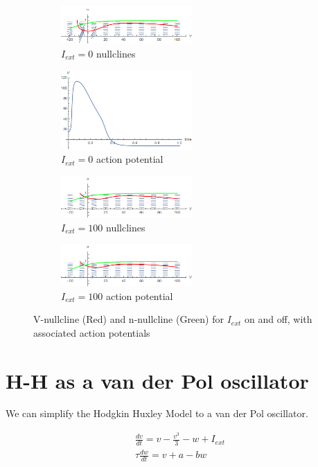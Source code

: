 \documentclass{article}
\begin{document}
\begin{figure}
\centering
\begin{subfigure}{.5\textwidth}
	\centering
	\includegraphics[width=5cm]{fast_slow_nullclines.png}
	\caption{$I_{ext}=0$ nullclines}
\end{subfigure}%
\begin{subfigure}{.5\textwidth}
	\centering
	\includegraphics[width=5cm]{zero_ext_actionpotential.png}
	\caption{$I_{ext}=0$ action potential}
\end{subfigure}
\begin{subfigure}{.5\textwidth}
	\centering
	\includegraphics[width=5cm]{fast_slow_nullclines_iext.png}
	\caption{$I_{ext}=100$ nullclines}
\end{subfigure}%
\begin{subfigure}{.5\textwidth}
	\centering
	\includegraphics[width=5cm]{fast_slow_nullclines_iext.png}
	\caption{$I_{ext}=100$ action potential}
\end{subfigure}
	\caption{V-nullcline (Red) and n-nullcline (Green) for $I_{ext}$ on and off, with associated action potentials}
	\label{fig:nullc}
\end{figure}

\section{H-H as a van der Pol oscillator}

We can simplify the Hodgkin Huxley Model to a van der Pol oscillator. 

\begin{align}
    \frac{dv}{dt} = v - \frac{v^3}{3} - w + I_{ext} \\
    \tau\frac{dw}{dt} = v + a - bw
\end{align}
\end{document}
